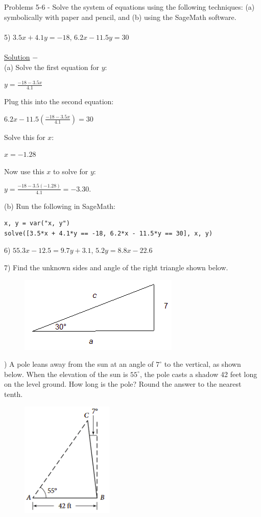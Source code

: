 \documentclass[12pt]{article}
\begin{document}
Problems 5-6 - Solve the system of equations using the following techniques:
(a) symbolically with paper and pencil, and
(b) using the SageMath software. \\ \\
5) $3.5x + 4.1y = -18$, $6.2x - 11.5y = 30$ \\ \\
\underline{Solution} $-$ \\
(a) Solve the first equation for $y$:
\begin{center}
$y = \frac{-18 - 3.5x}{4.1}$
\end{center}
Plug this into the second equation:
\begin{center}
$6.2x - 11.5 \left( \frac{-18 - 3.5x}{4.1} \right) = 30$
\end{center}
Solve this for $x$:
\begin{center}
$x = -1.28$
\end{center}
Now use this $x$ to solve for $y$:
\begin{center}
$y = \frac{-18 - 3.5(-1.28)}{4.1} = -3.30.$
\end{center}
(b) Run the following in SageMath:
\begin{verbatim}
x, y = var("x, y")
solve([3.5*x + 4.1*y == -18, 6.2*x - 11.5*y == 30], x, y)
\end{verbatim}

\pagebreak

6) $55.3x - 12.5 = 9.7y + 3.1$, $5.2y = 8.8x - 22.6$

\pagebreak

7) Find the unknown sides and angle of the right triangle shown below.
\begin{figure}[!h]
\includegraphics[scale=0.8]{figures/rightTriangle.png}
\end{figure}

) A pole leans away from the sun at an angle of $7^\circ$ to the vertical, as shown below.
When the elevation of the sun is $55^\circ$, the pole casts a shadow 42 feet long on the level ground.
How long is the pole?
Round the answer to the nearest tenth.
\begin{figure}[!h]
\includegraphics[scale=0.8]{figures/problem08.png}
\end{figure}
\end{document}
